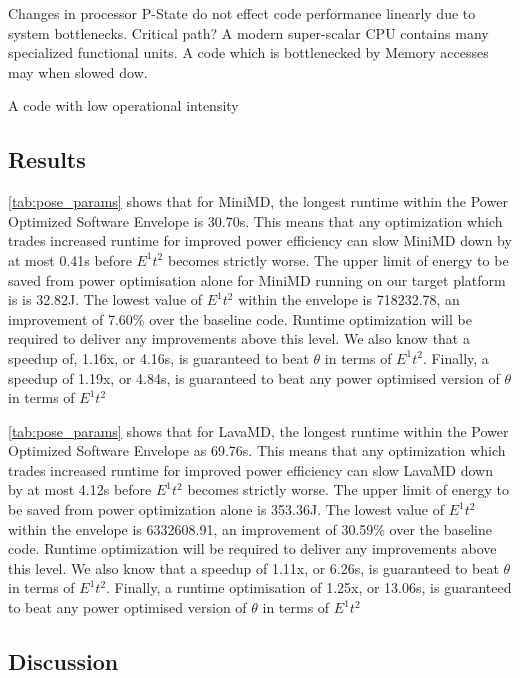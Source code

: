 Changes in processor P-State do not effect code performance linearly due to system bottlenecks. Critical path?  A modern super-scalar CPU contains many specialized functional units. A code which is bottlenecked by Memory accesses may when slowed dow.

A code with low operational intensity

\subsection{Results}

\autoref{tab:pose_params}  shows that for MiniMD, the longest runtime within the Power Optimized Software Envelope is 30.70s.
This means that any optimization which trades increased runtime for improved power efficiency can slow MiniMD down by at most 0.41s before $E^1t^2$ becomes strictly worse.
The upper limit of energy to be saved from power optimisation alone for MiniMD running on our target platform is is 32.82J.
The lowest value of $E^1t^2$ within the envelope is 718232.78, an improvement of 7.60\% over the baseline code.
Runtime optimization will be required to deliver any improvements above this level.
We also know that a speedup of, 1.16x, or 4.16s, is guaranteed to beat $\theta$ in terms of $E^1t^2$.
Finally, a speedup of 1.19x, or 4.84s, is guaranteed to beat any power optimised version of $\theta$ in terms of $E^1t^2$

\autoref{tab:pose_params}  shows that for LavaMD, the longest runtime within the Power Optimized Software Envelope as 69.76s.
This means that any optimization which trades increased runtime for improved power efficiency can slow LavaMD down by at most 4.12s before $E^1t^2$ becomes strictly worse.
The upper limit of energy to be saved from power optimization alone is 353.36J.
The lowest value of $E^1t^2$ within the envelope is 6332608.91, an improvement of 30.59\% over the baseline code.
Runtime optimization will be required to deliver any improvements above this level.
We also know that a speedup of 1.11x, or 6.26s, is guaranteed to beat $\theta$ in terms of $E^1t^2$.
Finally, a runtime optimisation of 1.25x, or 13.06s, is guaranteed to beat any power optimised version of $\theta$ in terms of $E^1t^2$

\subsection{Discussion}


